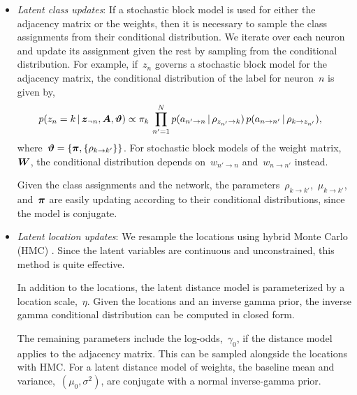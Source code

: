 \begin{itemize}
  \item \textit{Latent class updates}:
    If a stochastic block model is used for either the adjacency matrix
    or the weights, then it is necessary to sample the class assignments
    from their conditional distribution. We iterate over each neuron and
    update its assignment given the rest by sampling from the conditional
    distribution. For example, if~$z_n$ governs a stochastic block model
    for the adjacency matrix, the conditional distribution of the label
    for neuron~$n$ is given by,
    \begin{align}
      p(z_n = k \,|\, \boldsymbol{z}_{\neg n}, \boldsymbol{A}, \boldsymbol{\vartheta})
      &\propto \pi_{k} \,
      \prod_{n'=1}^N p(a_{n' \to n} \,|\, \rho_{z_{n'} \to k}) \,
                    p(a_{n \to n'} \,|\, \rho_{k \to z_{n'}}),
    \end{align}
    where~$\boldsymbol{\vartheta} = \{\boldsymbol{\pi}, \{\rho_{k \to k'}\} \}$. For stochastic block
    models of the weight matrix,~$\boldsymbol{W}$, the conditional distribution
    depends on~$w_{n' \to n}$ and~$w_{n \to n'}$ instead.

    Given the class assignments and the network, the
    parameters~$\rho_{k \to k'}$,~$\mu_{k \to k'}$, and~$\boldsymbol{\pi}$ are easily updating
    according to their conditional distributions, since the model is
    conjugate.
    
  \item \textit{Latent location updates}:
    We resample the locations using hybrid Monte Carlo (HMC) \cite{Neal10}.
    Since the latent variables are continuous and unconstrained,
    this method is quite effective.

    In addition to the locations, the latent distance model is parameterized
    by a location scale,~$\eta$. Given the locations and an inverse gamma
    prior, the inverse gamma conditional distribution can be computed in
    closed form.
    
    The remaining parameters include the log-odds,~$\gamma_0$, if the
    distance model applies to the adjacency matrix. This can be
    sampled alongside the locations with HMC.  For a latent distance
    model of weights, the baseline mean and
    variance,~$(\mu_0,\sigma^2)$, are conjugate with a normal
    inverse-gamma prior.
\end{itemize}

